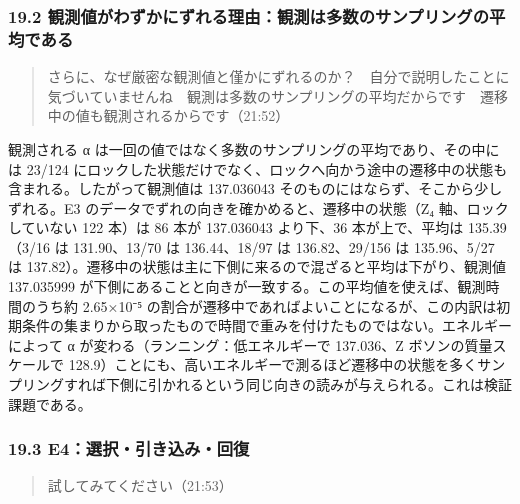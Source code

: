\documentclass[
  a4paper,
]{ltjsarticle}
\begin{document}
\subsubsection{19.2
観測値がわずかにずれる理由：観測は多数のサンプリングの平均である}\label{ux89b3ux6e2cux5024ux304cux308fux305aux304bux306bux305aux308cux308bux7406ux7531ux89b3ux6e2cux306fux591aux6570ux306eux30b5ux30f3ux30d7ux30eaux30f3ux30b0ux306eux5e73ux5747ux3067ux3042ux308b}

\begin{quote}
さらに、なぜ厳密な観測値と僅かにずれるのか？　自分で説明したことに気づいていませんね　観測は多数のサンプリングの平均だからです　遷移中の値も観測されるからです（21:52）
\end{quote}

観測される α
は一回の値ではなく多数のサンプリングの平均であり、その中には 23/124
にロックした状態だけでなく、ロックへ向かう途中の遷移中の状態も含まれる。したがって観測値は
137.036043 そのものにはならず、そこから少しずれる。E3
のデータでずれの向きを確かめると、遷移中の状態（Z₄ 軸、ロックしていない
122 本）は 86 本が 137.036043 より下、36 本が上で、平均は 135.39（3/16
は 131.90、13/70 は 136.44、18/97 は 136.82、29/156 は 135.96、5/27 は
137.82）。遷移中の状態は主に下側に来るので混ざると平均は下がり、観測値
137.035999
が下側にあることと向きが一致する。この平均値を使えば、観測時間のうち約
2.65×10⁻⁵
の割合が遷移中であればよいことになるが、この内訳は初期条件の集まりから取ったもので時間で重みを付けたものではない。エネルギーによって
α が変わる（ランニング：低エネルギーで 137.036、Z ボソンの質量スケールで
128.9）ことにも、高いエネルギーで測るほど遷移中の状態を多くサンプリングすれば下側に引かれるという同じ向きの読みが与えられる。これは検証課題である。

\subsubsection{19.3
E4：選択・引き込み・回復}\label{e4ux9078ux629eux5f15ux304dux8fbcux307fux56deux5fa9}

\begin{quote}
試してみてください（21:53）
\end{quote}
\end{document}
